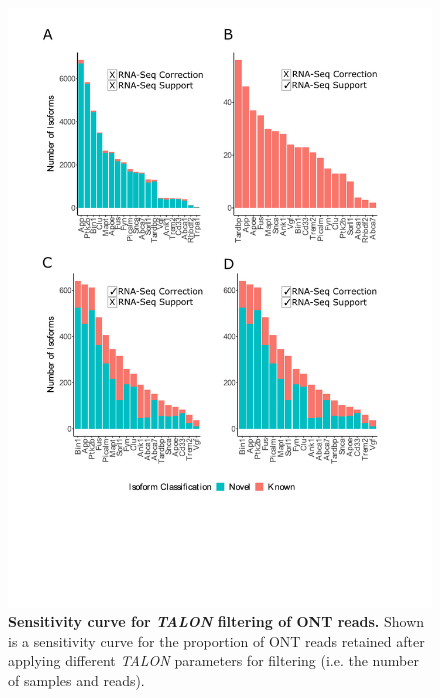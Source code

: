 \begin{figure}[!htp]
	\centering
	\includegraphics[page=3,trim={0cm 13cm 0cm 0cm},clip,scale = 0.55]{Figures/ONTTargetedTranscriptome_BioinformaticsPipeline}
	\captionsetup{width=0.95\textwidth,singlelinecheck=off}
	\caption[Sensitivity curve for \textit{TALON} filtering of ONT reads]%
	{\textbf{Sensitivity curve for \textit{TALON} filtering of ONT reads.} Shown is a sensitivity curve for the proportion of ONT reads retained after applying different \textit{TALON} parameters for filtering (i.e. the number of samples and reads).  
	}
	\label{fig:ONT_sensitivity}
\end{figure}

